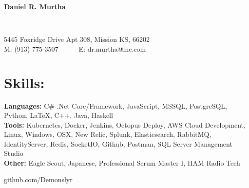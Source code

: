 \documentclass{res}
\begin{document}
\begin{resume}
\begin{changemargin}{-0.4in}{0in}
	\begin{center}
		\begin{Huge}
		\textbf{Daniel R. Murtha}
		\end{Huge}
	\\
		\begin{normalsize}
			5445 Foxridge Drive Apt 308, Mission KS, 66202\\
			M: (913) 775-3507~~~~~~E: dr.murtha@me.com
		\end{normalsize}
	\end{center}
\end{changemargin}\vspace{-5pt}
 \section{Skills:}\vspace{-10pt}
 \begin{minipage}{0.8\linewidth}
 	\begin{small}
 		\begin{flushleft}
 			{\bf Languages: }C\# .Net Core/Framework, JavaScript, MSSQL, PostgreSQL, Python, LaTeX, C++, Java, Haskell\\
			{\bf Tools: }Kubernetes, Docker, Jenkins, Octopus Deploy, AWS Cloud Development, Linux, Windows, OSX, New Relic, Splunk, Elasticsearch, RabbitMQ, IdentityServer, Redis, SocketIO, Github, Postman, SQL Server Management Studio \\
			{\bf Other: } Eagle Scout, Japanese, Professional Scrum Master I, HAM Radio Tech
 		\end{flushleft}
 	\end{small}   
 \end{minipage}\vspace{-15pt}
 \begin{minipage}{0.2\linewidth}
 	\begin{small}   
		\begin{flushright}
			github.com/Demonslyr\\
		\end{flushright}     
 	\end{small}   
 \end{minipage}\vspace{-10pt}
 

\end{resume}
\end{document}
